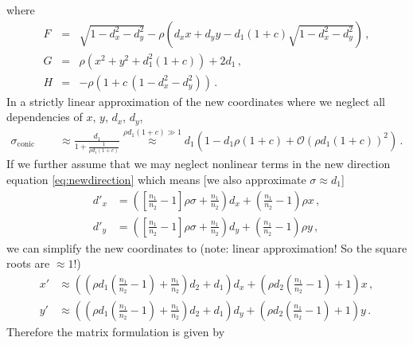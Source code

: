 \documentclass[12pt,a4paper,twoside,openright,BCOR10mm,headsepline,titlepage,abstracton,chapterprefix,final]{scrreprt}
\begin{document}
where
\begin{eqnarray}
   F &=& \sqrt{1 - d_x^2 - d_y^2} - \rho \left( d_x x + d_y y - d_1 (1+c) \sqrt{1 - d_x^2 - d_y^2} \right)\,, \\
   G &=& \rho (x^2 + y^2 + d_1^2 (1+c)) + 2 d_1\,, \\
   H &=& - \rho ( 1 + c \, (1 - d_x^2 - d_y^2) )\,.
\end{eqnarray}
In a strictly linear approximation of the new coordinates where we neglect all dependencies of $x$, $y$, $d_x$, $d_y$,
\begin{align}
 \sigma_\text{conic section} &\approx \frac{d_1}{1+ \frac{1}{\rho d_1 (1 + c)}} \stackrel{\rho d_1 (1+c)\gg 1}{\approx} d_1 \left(1 - d_1 \rho(1+c) + \mathcal{O}(\rho d_1 (1+c))^2\right)\,. 
\end{align}
If we further assume that we may neglect nonlinear terms in the new direction equation \eqref{eq:newdirection}
which means [we also approximate $\sigma \approx d_1$]\\
\begin{subequations}
 \begin{align}
  {d'}_x &= {\left(\left[\frac{n_{1}}{n_{2}} - 1\right]\rho \sigma + \frac{n_{1}}{n_{2}}\right)} d_{x} + {\left(\frac{n_{1}}{n_{2}} - 1\right)} \rho x\,,\\
  {d'}_y &= {\left(\left[\frac{n_{1}}{n_{2}} - 1\right]\rho \sigma + \frac{n_{1}}{n_{2}}\right)} d_{y} + {\left(\frac{n_{1}}{n_{2}} - 1\right)} \rho y\,,
 \end{align}
\end{subequations}
we can simplify the new coordinates to (note: linear approximation! So the square roots are $\approx1$!)
\begin{subequations}
\label{eq:linearapprox}
\begin{align}
 x' &\approx {\left({\left(\rho d_{1} \left(\frac{n_{1}}{n_{2}} - 1\right) + \frac{n_{1}}{n_{2}}\right)} d_{2} + d_{1}\right)} d_{x} + {\left(\rho d_{2} {\left(\frac{n_{1}}{n_{2}} - 1\right)} + 1\right)} x\,,\\
 y' &\approx {\left({\left(\rho d_{1} \left(\frac{n_{1}}{n_{2}} - 1\right) + \frac{n_{1}}{n_{2}}\right)} d_{2} + d_{1}\right)} d_{y} + {\left(\rho d_{2} {\left(\frac{n_{1}}{n_{2}} - 1\right)} + 1\right)} y\,.
\end{align}
\end{subequations}
Therefore the matrix formulation is given by
\end{document}
